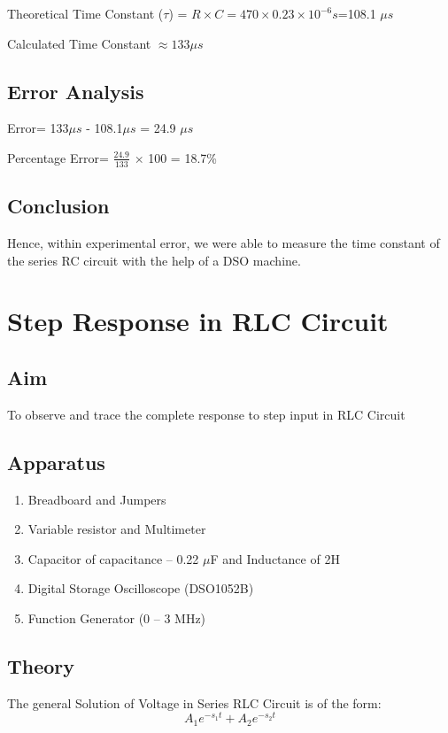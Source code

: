 \documentclass{article}
\begin{document}
Theoretical Time Constant ($\tau$) = $R\times C= 470\times0.23\times10^{-6}s$=108.1 $\mu s$

\noindent
Calculated Time Constant $\approx 133 \mu s$
\vspace{5px}

\subsection{Error Analysis}
Error= 133$ \mu s$ - 108.1$ \mu s$ = 24.9 $\mu s$

\noindent
Percentage Error= $ \frac{24.9}{133}$ $\times$ 100 = 18.7\%

\subsection{Conclusion}
Hence, within experimental error, we were able to measure the time constant of the series RC circuit with the help of a DSO machine.
\newpage

\section{Step Response in RLC Circuit}
\vspace{5px}
\subsection{Aim}
To observe and trace the complete response to step input in RLC Circuit
\vspace{5px}
\subsection{Apparatus}
\begin{enumerate}
\item Breadboard and Jumpers
\item Variable resistor and Multimeter
\item Capacitor of capacitance – 0.22 $\mu$F and Inductance of 2H
\item Digital Storage Oscilloscope (DSO1052B)
\item Function Generator (0 – 3 MHz)
\end{enumerate}
\vspace{5px}
\subsection{Theory}
\vspace{5px}
The general Solution of Voltage in Series RLC Circuit is of the form:
\[ A_1e^{-s_1t}+A_2e^{-s_2t} \]
\end{document}
